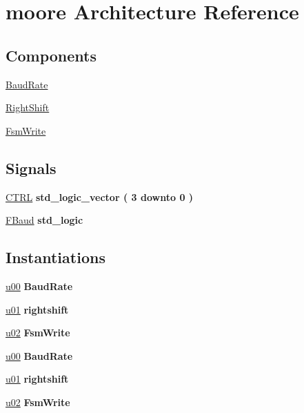 \hypertarget{class_r_s232_write_1_1moore}{}\section{moore Architecture Reference}
\label{class_r_s232_write_1_1moore}
\subsection*{Components}
 \begin{DoxyCompactItemize}
\item 
\hyperlink{class_r_s232_write_1_1moore_a7654bd82719bfde1c792d7828664dde2}{Baud\+Rate}  {\bfseries }  
\item 
\hyperlink{class_r_s232_write_1_1moore_a40d949610464b7b6388615a36e6c0213}{Right\+Shift}  {\bfseries }  
\item 
\hyperlink{class_r_s232_write_1_1moore_af14bb46d73e38ee879779205d461dcd3}{Fsm\+Write}  {\bfseries }  
\end{DoxyCompactItemize}
\subsection*{Signals}
 \begin{DoxyCompactItemize}
\item 
\hyperlink{class_r_s232_write_1_1moore_a3d8b83829d56d20a227b6507d3631397}{C\+T\+R\+L} {\bfseries \textcolor{comment}{std\+\_\+logic\+\_\+vector}\textcolor{vhdlchar}{ }\textcolor{vhdlchar}{(}\textcolor{vhdlchar}{ }\textcolor{vhdlchar}{ } \textcolor{vhdldigit}{3} \textcolor{vhdlchar}{ }\textcolor{keywordflow}{downto}\textcolor{vhdlchar}{ }\textcolor{vhdlchar}{ } \textcolor{vhdldigit}{0} \textcolor{vhdlchar}{ }\textcolor{vhdlchar}{)}\textcolor{vhdlchar}{ }} 
\item 
\hyperlink{class_r_s232_write_1_1moore_a6124f56309031033b8f7a798ca30372d}{F\+Baud} {\bfseries \textcolor{comment}{std\+\_\+logic}\textcolor{vhdlchar}{ }} 
\end{DoxyCompactItemize}
\subsection*{Instantiations}
 \begin{DoxyCompactItemize}
\item 
\hyperlink{class_r_s232_write_1_1moore_a47c959174c33814179fa80cd86e9fdd1}{u00}  {\bfseries Baud\+Rate}   
\item 
\hyperlink{class_r_s232_write_1_1moore_a261149681baa370af616d05085c60b21}{u01}  {\bfseries rightshift}   
\item 
\hyperlink{class_r_s232_write_1_1moore_a59af0c0173456dd2b8087a3882ac1a52}{u02}  {\bfseries Fsm\+Write}   
\item 
\hyperlink{class_r_s232_write_1_1moore_a47c959174c33814179fa80cd86e9fdd1}{u00}  {\bfseries Baud\+Rate}   
\item 
\hyperlink{class_r_s232_write_1_1moore_a261149681baa370af616d05085c60b21}{u01}  {\bfseries rightshift}   
\item 
\hyperlink{class_r_s232_write_1_1moore_a59af0c0173456dd2b8087a3882ac1a52}{u02}  {\bfseries Fsm\+Write}   
\end{DoxyCompactItemize}


